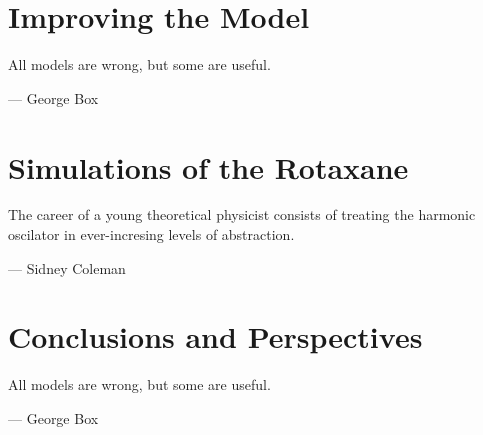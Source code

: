 \documentclass[11pt,a4paper,twoside]{vutinfth}
\newcommand*\cleartoleftpage{%
  \clearpage
  \ifodd\value{page}\hbox{}\newpage\fi
}
\newenvironment{smallfont}{\fontfamily{lmodern}\small\selectfont}{\par}
\newcounter{theo}[section] \setcounter{theo}{0}
\begin{document}
\chapter{Improving the Model}
\vspace{-1cm}
\epigraph{All models are wrong, but some are useful.}
{--- \textup{George Box}}





\chapter{Simulations of the Rotaxane}
\vspace{-1cm}
\epigraph{The career of a young theoretical physicist consists of treating the harmonic
oscilator in ever-incresing levels of abstraction.}
{--- \textup{Sidney Coleman}}




\chapter{Conclusions and Perspectives}
\vspace{-1cm}
\epigraph{All models are wrong, but some are useful.}
{--- \textup{George Box}}




\begin{appendices}

\end{appendices}

\twocolumn
% 
\printbibliography

\onecolumn

\cleardoublepage
\thispagestyle{empty}

\cleartoleftpage{} %

\end{document}

